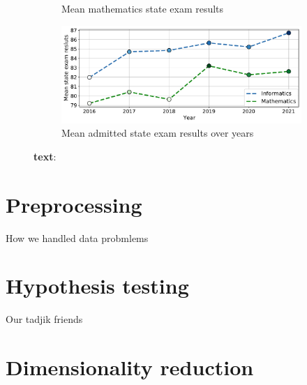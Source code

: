 \documentclass{article}
\begin{document}
\begin{figure}[h!]
\begin{subfigure}{0.49\textwidth}
    \caption{Mean mathematics state exam results}
    \label{fig:mapmath}
  \end{subfigure}
  \begin{subfigure}{0.98\textwidth}
    \includegraphics[width=\linewidth]{../gfx/ege_trend.pdf}
    \caption{Mean admitted state exam results over years}
    \label{fig:egetrend}
  \end{subfigure}\hfil
  \caption{\textbf{text}: }
\end{figure}

\section{Preprocessing}
How we handled data probmlems

\section{Hypothesis testing}
Our tadjik friends

\section{Dimensionality reduction}
\end{document}
